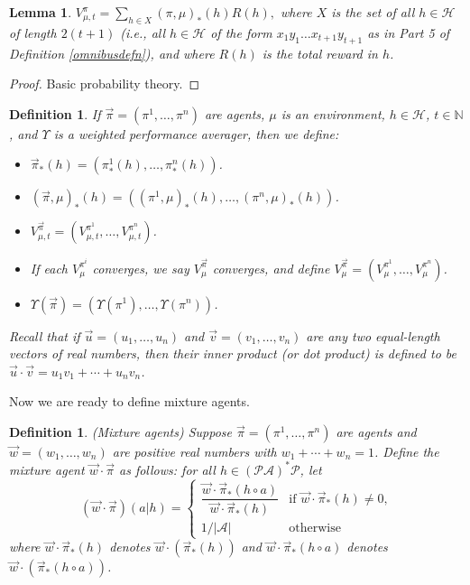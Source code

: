 \documentclass{article}
\newtheorem{definition}[theorem]{Definition}
\newtheorem{lemma}[theorem]{Lemma}
\begin{document}
\begin{lemma}
\label{basicprobabilitylemma}
    $V^\pi_{\mu,t}=\sum_{h\in X}(\pi,\mu)_*(h)R(h),$
    where $X$ is the set of all $h\in\mathcal H$
    of length $2(t+1)$ (i.e., all $h\in\mathcal H$ of the form
    $x_1y_1\ldots x_{t+1}y_{t+1}$
    as in Part 5 of Definition \ref{omnibusdefn}),
    and where $R(h)$ is the total reward in $h$.
\end{lemma}

\begin{proof}
    Basic probability theory.
\end{proof}

\begin{definition}
    If $\vec\pi=(\pi^1,\ldots,\pi^n)$ are agents, $\mu$ is an environment,
    $h\in\mathcal H$, $t\in\mathbb N$, and $\Upsilon$ is a weighted
    performance averager, then we define:
    \begin{itemize}
        \item $\vec\pi_*(h)=(\pi^1_*(h),\ldots,\pi^n_*(h))$.
        \item $(\vec\pi,\mu)_*(h)=((\pi^1,\mu)_*(h),\ldots,(\pi^n,\mu)_*(h))$.
        \item $V^{\vec\pi}_{\mu,t}=(V^{\pi^1}_{\mu,t},\ldots,V^{\pi^n}_{\mu,t})$.
        \item If each $V^{\pi^i}_\mu$ converges, we say $V^{\vec\pi}_\mu$
            converges, and define $V^{\vec\pi}_\mu=(V^{\pi^1}_\mu,\ldots,V^{\pi^n}_\mu)$.
        \item $\Upsilon(\vec\pi)=(\Upsilon(\pi^1),\ldots,\Upsilon(\pi^n))$.
    \end{itemize}
    Recall that if $\vec u=(u_1,\ldots,u_n)$ and
    $\vec v=(v_1,\ldots,v_n)$ are any two equal-length
    vectors of real numbers, then their \emph{inner product}
    (or \emph{dot product}) is defined to be
    $\vec u\cdot \vec v=u_1v_1+\cdots+u_nv_n$.
\end{definition}

Now we are ready to define mixture agents.

\begin{definition}
\label{maindefn}
    (Mixture agents)
    Suppose $\vec\pi=(\pi^1,\ldots,\pi^n)$ are agents and $\vec w=(w_1,\ldots,w_n)$
    are positive real numbers with $w_1+\cdots+w_n=1$.
    Define the \emph{mixture agent} $\vec w\cdot\vec\pi$ as follows: for all
    $h\in (\mathcal P\mathcal A)^*\mathcal P$, let
    \[
        (\vec w\cdot\vec\pi)(a|h)
        =
        \begin{cases}
            \dfrac{\vec w\cdot \vec\pi_*(h\circ a)}{\vec w\cdot \vec\pi_*(h)}
            &\mbox{if $\vec w\cdot \vec\pi_*(h)\not=0$,}\\
            1/|\mathcal{A}| &\mbox{otherwise}
        \end{cases}
    \]
    where
    $\vec w\cdot\vec\pi_*(h)$ denotes $\vec w\cdot(\vec\pi_*(h))$ and
    $\vec w\cdot\vec\pi_*(h\circ a)$ denotes
    $\vec w\cdot(\vec\pi_*(h\circ a))$.
\end{definition}
\end{document}
